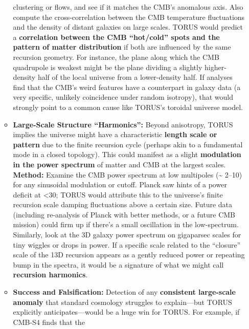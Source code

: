 \documentclass[
]{article}
\begin{document}
\begin{itemize}
\begin{itemize}
    clustering or flows, and see if it matches the CMB's anomalous axis.
    Also compute the cross-correlation between the CMB temperature
    fluctuations and the density of distant galaxies on large scales.
    TORUS would predict a \textbf{correlation between the CMB
    ``hot/cold'' spots and the pattern of matter distribution} if both
    are influenced by the same recursion geometry\hspace{0pt}. For
    instance, the plane along which the CMB quadrupole is weakest might
    be the plane dividing a slightly higher-density half of the local
    universe from a lower-density half\hspace{0pt}. If analyses find
    that the CMB's weird features have a counterpart in galaxy data (a
    very specific, unlikely coincidence under random isotropy), that
    would strongly point to a common cause like TORUS's toroidal
    universe model\hspace{0pt}.
  \item
    \textbf{Large-Scale Structure ``Harmonics'':} Beyond anisotropy,
    TORUS implies the universe might have a characteristic
    \textbf{length scale or pattern} due to the finite recursion cycle
    (perhaps akin to a fundamental mode in a closed topology). This
    could manifest as a slight \textbf{modulation in the power spectrum}
    of matter and CMB at the largest scales. \textbf{Method:} Examine
    the CMB power spectrum at low multipoles (\ell \textasciitilde{} 2--10)
    for any sinusoidal modulation or cutoff. Planck saw hints of a power
    deficit at \ell\textless30; TORUS would attribute this to the
    universe's finite recursion scale damping fluctuations above a
    certain size\hspace{0pt}. Future data (including re-analysis of
    Planck with better methods, or a future CMB mission) could firm up
    if there's a small oscillation in the low-\ell spectrum. Similarly,
    look at the 3D galaxy power spectrum on gigaparsec scales for tiny
    wiggles or drops in power. If a specific scale related to the
    ``closure'' scale of the 13D recursion appears as a gently reduced
    power or repeating bump in the spectra, it would be a signature of
    what we might call \textbf{recursion harmonics}\hspace{0pt}.
  \item
    \textbf{Success and Falsification:} Detection of any
    \textbf{consistent large-scale anomaly} that standard cosmology
    struggles to explain---but TORUS explicitly anticipates---would be a
    huge win for TORUS. For example, if CMB-S4 finds that the

\end{itemize}
\end{itemize}
\end{document}
